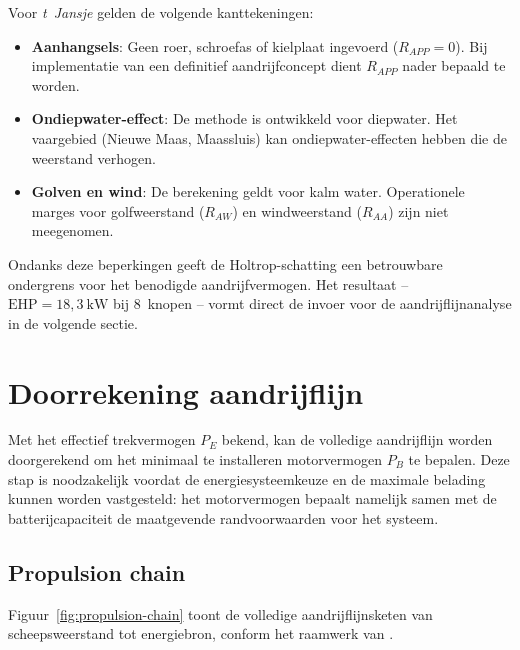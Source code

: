 Voor \emph{t~Jansje} gelden de volgende kanttekeningen:
 
\begin{itemize}
    \item \textbf{Aanhangsels}: Geen roer, schroefas of kielplaat ingevoerd ($R_{APP} = 0$).
          Bij implementatie van een definitief aandrijfconcept dient $R_{APP}$ nader bepaald
          te worden.
    \item \textbf{Ondiepwater-effect}: De methode is ontwikkeld voor diepwater. Het vaargebied
          (Nieuwe Maas, Maassluis) kan ondiepwater-effecten hebben die de weerstand verhogen.
    \item \textbf{Golven en wind}: De berekening geldt voor kalm water. Operationele marges
          voor golfweerstand ($R_{AW}$) en windweerstand ($R_{AA}$) zijn niet meegenomen.
\end{itemize}
 
Ondanks deze beperkingen geeft de Holtrop-schatting een betrouwbare ondergrens voor het
benodigde aandrijfvermogen. Het resultaat – $\mathrm{EHP} = 18{,}3\ \mathrm{kW}$ bij
8~knopen – vormt direct de invoer voor de aandrijflijnanalyse in de volgende sectie.
 
\section{Doorrekening aandrijflijn}
\label{sec:aandrijflijn}
 
Met het effectief trekvermogen $P_E$ bekend, kan de volledige aandrijflijn worden doorgerekend
om het minimaal te installeren motorvermogen $P_B$ te bepalen. Deze stap is noodzakelijk
voordat de energiesysteemkeuze en de maximale belading kunnen worden vastgesteld: het
motorvermogen bepaalt namelijk samen met de batterijcapaciteit de maatgevende randvoorwaarden
voor het systeem.
 
\subsection{Propulsion chain}
\label{subsec:propulsion-chain}
 
Figuur~\ref{fig:propulsion-chain} toont de volledige aandrijflijnsketen van scheepsweerstand
tot energiebron, conform het raamwerk van \cite{Molland2011}.
 
